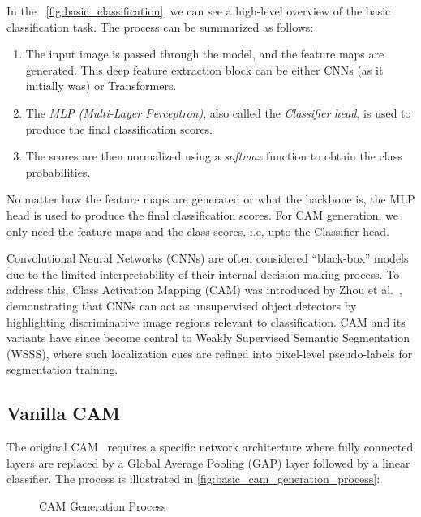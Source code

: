 In the ~\autoref{fig:basic_classification}, we can see a high-level overview of the basic classification task. The process can be summarized as follows:

\begin{enumerate}
    \item The input image is passed through the model, and the feature maps are generated. This deep feature extraction block can be either CNNs (as it initially was) or Transformers.
    \item The \emph{MLP (Multi-Layer Perceptron)}, also called the \emph{Classifier head}, is used to produce the final classification scores.
    \item The scores are then normalized using a \emph{softmax} function to obtain the class probabilities.
\end{enumerate}

No matter how the feature maps are generated or what the backbone is, the MLP head is used to produce the final classification scores. For CAM generation, we only need the feature maps and the class scores, i.e, upto the Classifier head.

Convolutional Neural Networks (CNNs) are often considered “black-box” models due to the limited interpretability of their internal decision-making process. To address this, Class Activation Mapping (CAM) was introduced by Zhou et al.~\cite{cam}, demonstrating that CNNs can act as unsupervised object detectors by highlighting discriminative image regions relevant to classification. CAM and its variants have since become central to Weakly Supervised Semantic Segmentation (WSSS), where such localization cues are refined into pixel-level pseudo-labels for segmentation training.

\subsection{Vanilla CAM}

The original CAM~\cite{cam} requires a specific network architecture where fully connected layers are replaced by a Global Average Pooling (GAP) layer followed by a linear classifier. The process is illustrated in \autoref{fig:basic_cam_generation_process}:

\begin{figure}[htbp]
    \centering
    \caption{CAM Generation Process}
    \label{fig:basic_cam_generation_process}
\end{figure}


